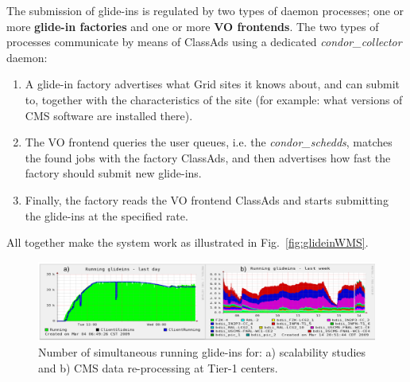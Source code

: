 \documentclass[a4paper]{jpconf}
\begin{document}
The submission of glide-ins is regulated by two types of daemon processes; 
one or more \textbf{glide-in factories} and one or more \textbf{VO frontends}. 
The two types of processes communicate by means of ClassAds using a dedicated \emph{condor\_collector} daemon:
\begin{enumerate}
\item A glide-in factory advertises what Grid sites it knows about, and can submit to, together with the characteristics of the site 
(for example: what versions of CMS software are installed there).
\item The VO frontend queries the user queues, i.e. the \emph{condor\_schedds}, 
matches the found jobs with the factory ClassAds, 
and then advertises how fast the factory should submit new glide-ins.
\item Finally, the factory reads the VO frontend ClassAds and starts submitting the glide-ins at the specified rate.
\end{enumerate}

All together make the system work as illustrated in Fig.~\ref{fig:glideinWMS}.
\begin{figure}
\begin{center}
\includegraphics[scale=0.55]{glideinT1stat}
\end{center}
\caption{Number of simultaneous running glide-ins for: a) scalability studies and b) CMS data re-processing at Tier-1 centers.}
\label{fig:glideinT1stat}
\end{figure}
\end{document}
